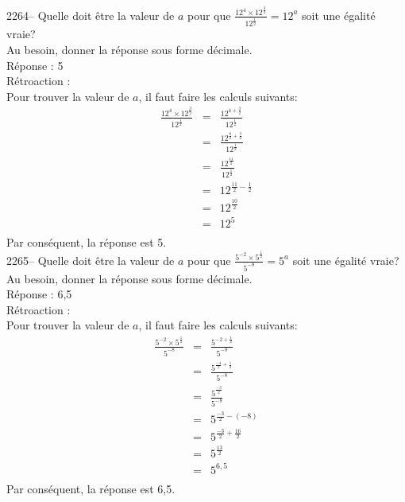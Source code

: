 \documentclass[letterpaper, 12pt]{article}
\begin{document}
2264-- Quelle doit \^etre la valeur de $a$ pour que $\frac{12^{4}\times12^{\frac{3}{2}}}{12^{\frac{1}{2}}}=12^{a}$ soit une \'egalit\'e vraie?\\
Au besoin, donner la r\'eponse sous forme d\'ecimale.\\

R\'eponse : 5\\

R\'etroaction :\\
Pour trouver la valeur de $a$, il faut faire les calculs suivants:
\begin{eqnarray*}
\frac{12^{4}\times12^{\frac{3}{2}}}{12^{\frac{1}{2}}}&=&\frac{12^{4+\frac{3}{2}}}{12^{\frac{1}{2}}}\\[2mm]
&=&\frac{12^{\frac{8}{2}+\frac{3}{2}}}{12^{\frac{1}{2}}}\\[2mm]
&=&\frac{12^{\frac{11}{2}}}{12^{\frac{1}{2}}}\\[2mm]
&=&12^{\frac{11}{2}-\frac{1}{2}}\\[2mm]
&=&12^{\frac{10}{2}}\\[2mm]
&=&12^{5}\\
\end{eqnarray*}
Par cons\'equent, la r\'eponse est 5.\\

2265--  Quelle doit \^etre la valeur de $a$ pour que $\frac{5^{-2}\times5^{\frac{1}{2}}}{5^{-8}}=5^{a}$ soit une \'egalit\'e vraie?\\
Au besoin, donner la r\'eponse sous forme d\'ecimale.\\

R\'eponse : 6,5\\

R\'etroaction :\\
Pour trouver la valeur de $a$, il faut faire les calculs suivants:
\begin{eqnarray*}
\frac{5^{-2}\times5^{\frac{1}{2}}}{5^{-8}}&=&\frac{5^{-2+\frac{1}{2}}}{5^{-8}}\\[2mm]
&=&\frac{5^{\frac{-4}{2}+\frac{1}{2}}}{5^{-8}}\\[2mm]
&=&\frac{5^{\frac{-3}{2}}}{5^{-8}}\\[2mm]
&=&5^{\frac{-3}{2}-(-8)}\\[2mm]
&=&5^{\frac{-3}{2}+\frac{16}{2}}\\[2mm]
&=&5^{\frac{13}{2}}\\[2mm]
&=&5^{6,5}\\
\end{eqnarray*}
Par cons\'equent, la r\'eponse est 6,5.\\
\end{document}
